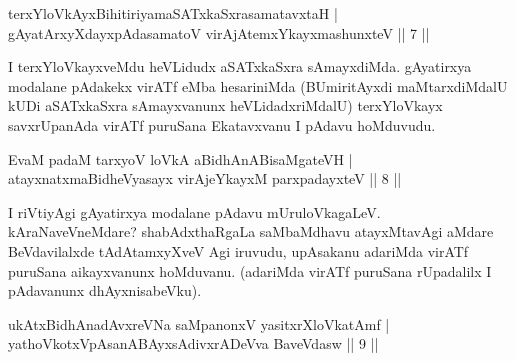 
\begin{shl}
\footnotemark{}terxYloVkAyxBihitiriyamaSATxkaSxrasamatavxtaH | \\
gAyatArxyXdayxpAdasamatoV virAjA\s \s temxYkayxmashunxteV \hfill ||  7 || 
\end{shl}

\begin{artha} 
I terxYloVkayxveMdu heVLidudx aSATxkaSxra sAmayxdiMda. gAyatirxya 
modalane pAdakekx virATf eMba hesariniMda (BUmiritAyxdi maMtarxdiMdalU 
kUDi aSATxkaSxra sAmayxvanunx heVLidadxriMdalU) terxYloVkayx 
savxrUpanAda virATf puruSana Ekatavxvanu I pAdavu hoMduvudu.
\end{artha}

\begin{shl}
EvaM padaM tarxyoV loVkA aBidhAnABisaMgateVH | \\
atayxnatxmaBidheVyasayx virAjeYkayxM parxpadayxteV \hfill ||  8 || 
\end{shl}

\begin{artha} 
I riVtiyAgi gAyatirxya modalane pAdavu mUruloVkagaLeV. 
kAraNaveVneMdare? shabAdxthaRgaLa saMbaMdhavu atayxMtavAgi aMdare 
BeVdavilalxde tAdAtamxyXveV Agi iruvudu, upAsakanu adariMda virATf 
puruSana aikayxvanunx hoMduvanu. (adariMda virATf puruSana rUpadalilx 
I pAdavanunx dhAyxnisabeVku).
\end{artha}


\begin{shl}
\footnotemark[1]{}ukAtxBidhAnadAvxreVNa saMpanonxV yasitxrXloVkatAmf | \\
yathoVkotxVpAsanABAyxsAdivxrADeVva BaveVdasw \hfill ||  9 || 
\end{shl}

